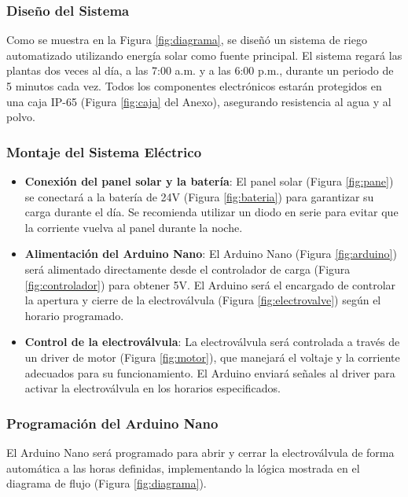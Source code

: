 \documentclass[12pt]{article}
\begin{document}
\subsubsection{Diseño del Sistema}
Como se muestra en la Figura \ref{fig:diagrama}, se diseñó un sistema de riego automatizado utilizando energía solar como fuente principal. El sistema regará las plantas dos veces al día, a las 7:00 a.m. y a las 6:00 p.m., durante un periodo de 5 minutos cada vez. Todos los componentes electrónicos estarán protegidos en una caja IP-65 (Figura \ref{fig:caja} del Anexo), asegurando resistencia al agua y al polvo.

\subsubsection{Montaje del Sistema Eléctrico}
\begin{itemize}
      \item \textbf{Conexión del panel solar y la batería}: El panel solar (Figura \ref{fig:pane}) se conectará a la batería de 24V (Figura \ref{fig:bateria}) para garantizar su carga durante el día. Se recomienda utilizar un diodo en serie para evitar que la corriente vuelva al panel durante la noche.

      \item \textbf{Alimentación del Arduino Nano}: El Arduino Nano (Figura \ref{fig:arduino}) será alimentado directamente desde el controlador de carga (Figura \ref{fig:controlador}) para obtener 5V. El Arduino será el encargado de controlar la apertura y cierre de la electroválvula (Figura \ref{fig:electrovalve}) según el horario programado.

      \item \textbf{Control de la electroválvula}: La electroválvula será controlada a través de un driver de motor (Figura \ref{fig:motor}), que manejará el voltaje y la corriente adecuados para su funcionamiento. El Arduino enviará señales al driver para activar la electroválvula en los horarios especificados.
\end{itemize}

\subsubsection{Programación del Arduino Nano}
El Arduino Nano será programado para abrir y cerrar la electroválvula de forma automática a las horas definidas, implementando la lógica mostrada en el diagrama de flujo (Figura \ref{fig:diagrama}).
\end{document}
